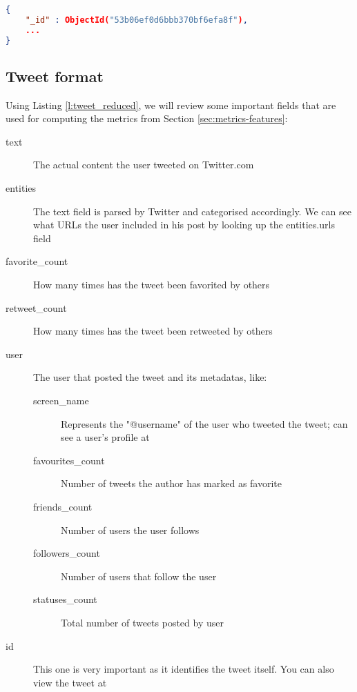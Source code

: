 \begin{lstlisting}[caption=MongoDB \_id, label=l:_id_mongo, language=json,firstnumber=1]
{
	"_id" : ObjectId("53b06ef0d6bbb370bf6efa8f"),
	...
}
\end{lstlisting}

\subsection{Tweet format}
\label{sec:tweet-format}

Using Listing \ref{l:tweet_reduced}, we will review some important fields that are used for computing the metrics from Section \ref{sec:metrics-features}:
\begin{description}
	\item[text] The actual content the user tweeted on Twitter.com
	\item[entities] The text field is parsed by Twitter and categorised accordingly. We can see what URLs the user included in his post by looking up the entities.urls field
    \item[favorite\_count] How many times has the tweet been favorited by others
    \item[retweet\_count] How many times has the tweet been retweeted by others
    \item[user] The user that posted the tweet and its metadatas, like:
    \begin{description}
    	\item[screen\_name] Represents the "@username" of the user who tweeted the tweet; can see a user's profile at 
        \item[favourites\_count] Number of tweets the author has marked as favorite
        \item[friends\_count] Number of users the user follows
        \item[followers\_count] Number of users that follow the user
        \item[statuses\_count] Total number of tweets posted by user
    \end{description}
    \item[id] This one is very important as it identifies the tweet itself. You can also view the tweet at 
\end{description}

